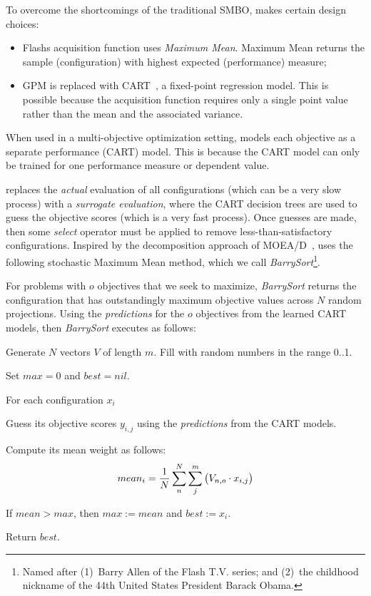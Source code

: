 To overcome the shortcomings of the traditional SMBO, \flash makes certain design choices:
\begin{itemize}[leftmargin=*]
    \item {\sc Flash}\textquotesingle s acquisition function uses  \textit{Maximum Mean}. Maximum Mean returns the sample (configuration) with highest expected (performance) measure;
    \item GPM is replaced with CART~\cite{breiman1984classification}, a fixed-point regression model. This is possible because the acquisition function requires only a single point value rather than the mean and the associated variance. 
\end{itemize}
When used in a multi-objective optimization setting, \flash models each objective as a separate performance (CART) model. This is because the CART model can only be trained for one performance measure or dependent value.

\flash replaces the {\em actual} evaluation of all configurations (which can be a very slow process) with a {\em surrogate evaluation}, where the CART decision trees are used to guess
the objective scores (which is a very fast process). Once guesses are made,
then some {\em select} operator must be applied to remove less-than-satisfactory configurations.
Inspired by the
 decomposition approach of MOEA/D~\cite{zhang2007moea}, \flash uses
 the   following 
 stochastic Maximum Mean method, which we call {\em BarrySort}\footnote{Named after (1)~Barry Allen of the Flash T.V. series;
 and (2)~the childhood nickname of the 44th  United States President Barack Obama.}.

 For problems with $o$ objectives that we seek to maximize,
 {\em BarrySort} returns the configuration that has outstandingly maximum objective values across $N$ random projections. Using the {\em predictions}
for the $o$ objectives from the learned CART models,
then {\em BarrySort} executes as follows:
\bi[leftmargin=*]
 \item
 Generate $N$ vectors $V$ of length $m$. Fill
 with random numbers in the range 0..1.
\item Set $\mathit{max=0}$ and $\mathit{best=nil}$.
  \item For each configuration $x_i$
 \bi
 \item
 Guess its objective scores $y_{i,j}$ using the {\em predictions} from the CART models.
\item
Compute its mean weight as follows: 
\begin{equation}\label{eq:mm}
 \centering
 mean_i=\frac{1}{N}\sum_n^N \sum_j^{{\mathit m}}\left(V_{n,o} \cdot x_{i,j}\right)
 \end{equation}
 \item
 If $\mathit{mean} > \mathit{max}$, then  $\mathit{max:=mean}$ and $\mathit{best}:=x_i$.
 \ei
\item
Return $\mathit{best}$.
\ei

